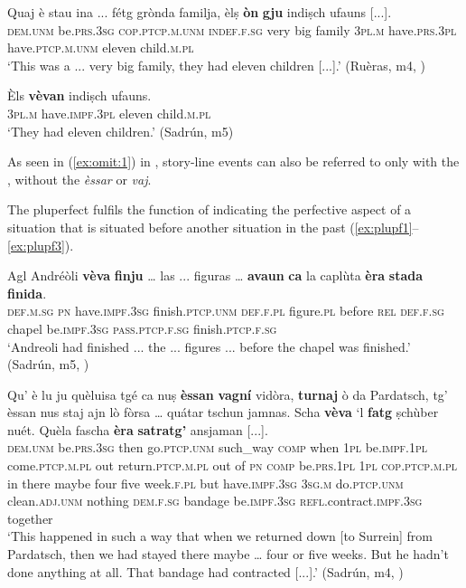 \ea
\label{ex:prf:inch:3}
\gll Quaj è stau ina ... fétg grònda familja, èlṣ \textbf{òn} \textbf{gju} indiṣch ufauns [...].\\
\textsc{dem.unm}  be.\textsc{prs.3sg}  \textsc{cop.ptcp.m.unm}  \textsc{indef.f.sg} {} very big family \textsc{3pl.m} have.\textsc{prs.3pl} have.\textsc{ptcp.m.unm} eleven child.\textsc{m.pl}\\
\glt `This was a ... very big family, they had eleven children [...].' (Ruèras, m4, )
\z

\ea
\label {ex:prf:inch:4}
\gll Èls \textbf{vèvan} indiṣch ufauns.\\
\textsc{3pl.m} have.\textsc{impf.3pl} eleven child.\textsc{m.pl}\\
\glt `They had eleven children.' (Sadrún, m5)
\z

As seen in (\ref{ex:omit:1}) in , story-line events can also be referred to only with the , without the  \textit{èssar} or \textit{vaj}.


\label{sec:4.1.2.2.4}
The pluperfect fulfils the function of indicating the perfective aspect of a situation that is situated before another situation in the past (\ref{ex:plupf1}--\ref{ex:plupf3}).

\ea
\label{ex:plupf1}
\gll  Agl Andréòli \textbf{vèva} \textbf{finju} … las ... figuras … \textbf{avaun} \textbf{ca} la caplùta \textbf{èra} \textbf{stada} \textbf{finida}.\\
\textsc{def.m.sg} \textsc{pn} have.\textsc{impf.3sg} finish.\textsc{ptcp.unm} {} \textsc{def.f.pl} {} figure.\textsc{pl} {} before \textsc{rel} \textsc{def.f.sg} chapel be.\textsc{impf.3sg} \textsc{pass.ptcp.f.sg} finish.\textsc{ptcp.f.sg}\hspace*{-2mm}\\
\glt `Andreoli had finished ... the ... figures ... before the chapel was finished.' (Sadrún, m5, )
\z

\ea
\label{ex:plupf2}
\gll  Qu' è lu ju quèluisa tgé ca nuṣ \textbf{èssan} \textbf{vagní} vidòra, \textbf{turnaj} ò da Pardatsch, tg' èssan nus staj ajn lò fòrsa … quátar tschun jamnas. Scha \textbf{vèva} `l \textbf{fatg} ṣchùber nuét. Quèla fascha \textbf{èra}  \textbf{satratg’} ansjaman [...]. \\
\textsc{dem.unm} be.\textsc{prs.3sg} then go.\textsc{ptcp.unm} such\_way \textsc{comp} when \textsc{1pl} be.\textsc{impf.1pl} come.\textsc{ptcp.m.pl} out return.\textsc{ptcp.m.pl} out of \textsc{pn} \textsc{comp} be.\textsc{prs.1pl} \textsc{1pl} \textsc{cop.ptcp.m.pl} in there maybe {} four five week.\textsc{f.pl} but have.\textsc{impf.3sg} \textsc{3sg.m} do.\textsc{ptcp.unm} clean.\textsc{adj.unm} nothing \textsc{dem.f.sg} bandage be.\textsc{impf.3sg} \textsc{refl.}contract.\textsc{impf.3sg} together \\
\glt `This happened in such a way that when we returned down [to Surrein] from Pardatsch, then we had stayed there maybe … four or five weeks. But he hadn’t done anything at all. That bandage had contracted [...].' (Sadrún, m4, )
\z


